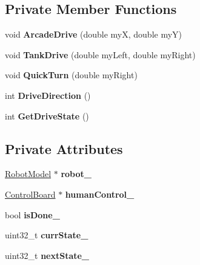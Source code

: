 \subsection*{Private Member Functions}
\begin{DoxyCompactItemize}
\item 
\mbox{\label{class_drive_controller_a59d4b701fd83e101a3aaf9726fc626dd}} 
void {\bfseries Arcade\+Drive} (double myX, double myY)
\item 
\mbox{\label{class_drive_controller_a66ebb563f42372e249c8de422d74312b}} 
void {\bfseries Tank\+Drive} (double my\+Left, double my\+Right)
\item 
\mbox{\label{class_drive_controller_a3e9f778228ea2812b372fbb43fdf5a08}} 
void {\bfseries Quick\+Turn} (double my\+Right)
\item 
\mbox{\label{class_drive_controller_aeecbfd3643cadb19cc30af0f22c41c98}} 
int {\bfseries Drive\+Direction} ()
\item 
\mbox{\label{class_drive_controller_a001ab748cefcfdb9d4aa10b3cf699d53}} 
int {\bfseries Get\+Drive\+State} ()
\end{DoxyCompactItemize}
\subsection*{Private Attributes}
\begin{DoxyCompactItemize}
\item 
\mbox{\label{class_drive_controller_abc5ee587234574826c58a259902fa86f}} 
\hyperlink{class_robot_model}{Robot\+Model} $\ast$ {\bfseries robot\+\_\+}
\item 
\mbox{\label{class_drive_controller_af9b33cc9fd301b54d3cdb31223d8216a}} 
\hyperlink{class_control_board}{Control\+Board} $\ast$ {\bfseries human\+Control\+\_\+}
\item 
\mbox{\label{class_drive_controller_ad71cbf0f66adf918dba524662867775f}} 
bool {\bfseries is\+Done\+\_\+}
\item 
\mbox{\label{class_drive_controller_ac8e6cfbda24abc7c033e6ec9c2f75f13}} 
uint32\+\_\+t {\bfseries curr\+State\+\_\+}
\item 
\mbox{\label{class_drive_controller_abc8e83a004bdf2edd3b76aeb7d5b66d2}} 
uint32\+\_\+t {\bfseries next\+State\+\_\+}
\end{DoxyCompactItemize}


